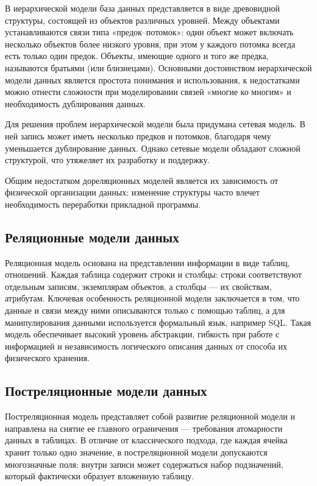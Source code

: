 В иерархической модели база данных представляется в виде древовидной структуры, состоящей из объектов различных уровней. Между объектами устанавливаются связи типа «предок–потомок»: один объект может включать несколько объектов более низкого уровня, при этом у каждого потомка всегда есть только один предок. Объекты, имеющие одного и того же предка, называются братьями (или близнецами). Основными достоинством иерархической модели данных является простота понимания и использования, к недостатками можно отнести сложности при моделировании связей «многие ко многим» и необходимость дублирования данных.

Для решения проблем иерархической модели была придумана сетевая модель. В ней запись может иметь несколько предков и потомков, благодаря чему уменьшается дублирование данных. Однако сетевые модели обладают сложной структурой, что утяжеляет их разработку и поддержку.

Общим недостатком дореляционных моделей является их зависимость от физической организации данных: изменение структуры часто влечет необходимость переработки прикладной программы.

\subsection*{Реляционные модели данных}
Реляционная модель основана на представлении информации в виде таблиц, отношений. Каждая таблица содержит строки и столбцы: строки соответствуют отдельным записям, экземплярам объектов, а столбцы --- их свойствам, атрибутам. Ключевая особенность реляционной модели заключается в том, что данные и связи между ними описываются только с помощью таблиц, а для манипулирования данными используется формальный язык, например SQL. Такая модель обеспечивает высокий уровень абстракции, гибкость при работе с информацией и независимость логического описания данных от способа их физического хранения.

\subsection*{Постреляционные модели данных}
Постреляционная модель представляет собой развитие реляционной модели и направлена на снятие ее главного ограничения --- требования атомарности данных в таблицах. В отличие от классического подхода, где каждая ячейка хранит только одно значение, в постреляционной модели допускаются многозначные поля: внутри записи может содержаться набор подзначений, который фактически образует вложенную таблицу.

